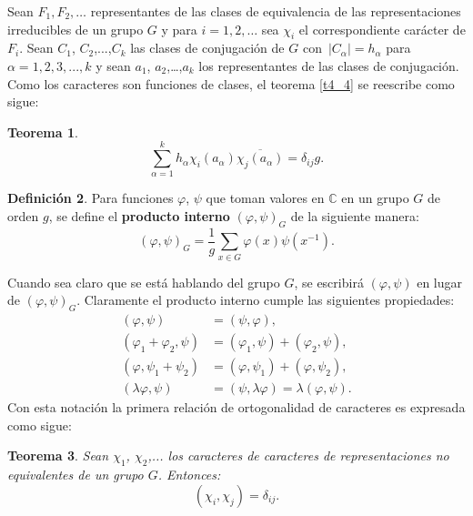 \documentclass[12pt]{book}
\newtheorem{theorem}{Teorema}[section]
\theoremstyle{definition}
\newtheorem{definition}[theorem]{Definición}
\newcounter{in}
\newcounter{ini}
\begin{document}
Sean $F_{1}, F_{2}, \ldots$ representantes de las clases de
equivalencia de las representaciones irreducibles de un grupo $G$ y
para $i=1,2, \ldots$ sea $\chi_{i}$ el correspondiente carácter
de $F_{i}$.  Sean $C_{1}$, $C_{2}$,...,$C_{k}$ las
clases de conjugación de $G$ con~$|C_{\alpha}|=h_{\alpha}$
para $\alpha=1, 2, 3,...,k$ y sean $a_{1}$, $a_{2}$,\ldots,$a_{k}$ los
representantes de las clases de conjugación. Como los caracteres son
funciones de clases, el teorema \ref{t4_4} se reescribe como sigue:
\begin{theorem}
  \label{t4_4p}
  \begin{equation}
    \label{eq:32}
    \sum_{\alpha=1}^{k} h_{\alpha} \chi_{i}(a_{\alpha}) \overline{\chi_{j}(a_{\alpha})} = \delta_{ij}g.
  \end{equation}
\end{theorem}
\begin{definition}
Para funciones $\varphi$, $\psi$ que toman valores en $\mathbb{C}$ en
un grupo $G$ de orden $g$, se define el \textbf{producto interno}
$(\varphi,\psi)_{G}$ de la siguiente manera:
\begin{equation*}
(\varphi,\psi)_{G} = \frac{1}{g} \sum_{x \in G} \varphi(x) \psi(x^{-1}).
\end{equation*}
\end{definition}
Cuando sea claro que se está hablando del grupo $G$, se escribirá
$(\varphi,\psi)$ en lugar de $(\varphi,\psi)_{G}$. Claramente el
producto interno cumple las siguientes propiedades:
\begin{equation}
  \label{eq:33}
    \begin{aligned}
    (\varphi,\psi) &= (\psi,\varphi), \\
    (\varphi_{1}+\varphi_{2},\psi) &= (\varphi_{1},\psi)+(\varphi_{2},\psi), \\
    (\varphi,\psi_{1}+\psi_{2}) &= (\varphi,\psi_{1})+(\varphi,\psi_{2}), \\
    (\lambda \varphi,\psi) &= (\psi,\lambda \varphi)=\lambda (\varphi,\psi).
  \end{aligned}
\end{equation}
Con esta notación la primera relación de ortogonalidad de caracteres
es expresada como sigue:

\begin{theorem}
  \label{t4_4pp}
  Sean $\chi_{1}$, $\chi_{2}$,... los caracteres de caracteres de
  representaciones no equivalentes de un grupo $G$. Entonces:
  \begin{equation*}
    (\chi_{i},\chi_{j})=\delta_{ij}.
  \end{equation*} 
\end{theorem}
\end{document}
